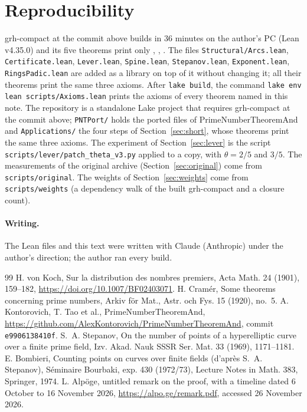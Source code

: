 \documentclass[11pt]{article}
\theoremstyle{definition}
\theoremstyle{remark}
\begin{document}
\appendix
\section{Reproducibility}

grh-compact at the commit above builds in 36 minutes on the author's PC (Lean v4.35.0) and its five
theorems print only , , . The files
\texttt{Structural/Arcs.lean}, \texttt{Certificate.lean}, \texttt{Lever.lean},
\texttt{Spine.lean}, \texttt{Stepanov.lean}, \texttt{Exponent.lean}, \texttt{RingsPadic.lean} are added as a library on top of it without changing
it; all their theorems print the same three axioms. After \texttt{lake build}, the command
\texttt{lake env lean scripts/Axioms.lean} prints the axioms of every theorem named in this note. The repository is a standalone Lake project that requires
grh-compact at the commit above; \texttt{PNTPort/} holds the ported files of PrimeNumberTheoremAnd
and \texttt{Applications/} the four steps of Section~\ref{sec:short}, whose theorems print the
same three axioms. The experiment of Section~\ref{sec:lever} is the script
\texttt{scripts/lever/patch\_theta\_v3.py} applied to a copy, with $\theta=2/5$ and $3/5$. The measurements of the original archive (Section~\ref{sec:original}) come from \texttt{scripts/original}. The weights of Section~\ref{sec:weights} come from \texttt{scripts/weights} (a dependency walk of the built grh-compact and a closure count).

\paragraph{Writing.} The Lean files and this text were written with Claude (Anthropic) under the
author's direction; the author ran every build.

\begin{thebibliography}{99}
 H. von Koch, Sur la distribution des nombres premiers, Acta Math. 24 (1901),
159--182, \url{https://doi.org/10.1007/BF02403071}.
 H. Cramér, Some theorems concerning prime numbers, Arkiv för Mat., Astr. och
Fys. 15 (1920), no.~5.
 A. Kontorovich, T. Tao et al., PrimeNumberTheoremAnd,
\url{https://github.com/AlexKontorovich/PrimeNumberTheoremAnd}, commit \texttt{e9906138410f}.
 S.~A. Stepanov, On the number of points of a hyperelliptic curve over a
finite prime field, Izv. Akad. Nauk SSSR Ser. Mat. 33 (1969), 1171--1181.
 E. Bombieri, Counting points on curves over finite fields (d'après
S.~A. Stepanov), Séminaire Bourbaki, exp. 430 (1972/73), Lecture Notes in Math. 383, Springer, 1974.
 L. Alpöge, untitled remark on the proof, with a timeline dated 6 October to
16 November 2026, \url{https://alpo.ge/remark.pdf}, accessed 26 November 2026.
\end{thebibliography}
\end{document}
